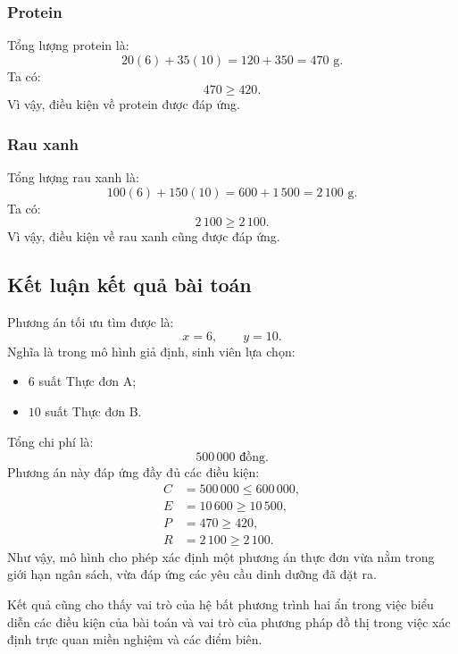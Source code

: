 \documentclass[12pt,a4paper]{article}
\begin{document}
\subsubsection*{Protein}
Tổng lượng protein là:
\[
20(6)+35(10)
=120+350
=470\text{ g}.
\]
Ta có:
\[
470\geq420.
\]
Vì vậy, điều kiện về protein được đáp ứng.
\subsubsection*{Rau xanh}
Tổng lượng rau xanh là:
\[
100(6)+150(10)
=600+1\,500
=2\,100\text{ g}.
\]
Ta có:
\[
2\,100\geq2\,100.
\]
Vì vậy, điều kiện về rau xanh cũng được đáp ứng.


\subsection{Kết luận kết quả bài toán}

Phương án tối ưu tìm được là:
\[
\boxed{
x=6,\qquad y=10.
}
\]
Nghĩa là trong mô hình giả định, sinh viên lựa chọn:
\begin{itemize}
    \item $6$ suất Thực đơn A;
    \item $10$ suất Thực đơn B.
\end{itemize}
Tổng chi phí là:
\[
\boxed{
500\,000\text{ đồng}.
}
\]
Phương án này đáp ứng đầy đủ các điều kiện:
\[
\boxed{
\begin{aligned}
C&=500\,000\leq600\,000,\\
E&=10\,600\geq10\,500,\\
P&=470\geq420,\\
R&=2\,100\geq2\,100.
\end{aligned}}
\]
Như vậy, mô hình cho phép xác định một phương án thực đơn vừa nằm trong giới hạn ngân sách, vừa đáp ứng các yêu cầu dinh dưỡng đã đặt ra.

Kết quả cũng cho thấy vai trò của hệ bất phương trình hai ẩn trong việc biểu diễn các điều kiện của bài toán và vai trò của phương pháp đồ thị trong việc xác định trực quan miền nghiệm và các điểm biên.

\end{document}
